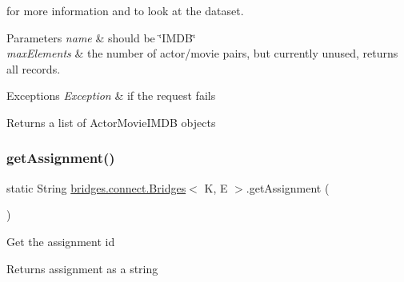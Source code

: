 for more information and to look at the dataset.


\begin{DoxyParams}{Parameters}
{\em name} & should be \char`\"{}\+I\+M\+D\+B\char`\"{} \\
\hline
{\em max\+Elements} & the number of actor/movie pairs, but currently unused, returns all records. \\
\hline
\end{DoxyParams}

\begin{DoxyExceptions}{Exceptions}
{\em Exception} & if the request fails\\
\hline
\end{DoxyExceptions}
\begin{DoxyReturn}{Returns}
a list of Actor\+Movie\+I\+M\+DB objects 
\end{DoxyReturn}
\hypertarget{classbridges_1_1connect_1_1_bridges_ae488b9bf0d696adb7f5a6ba7ce4ff2fd}{}\label{classbridges_1_1connect_1_1_bridges_ae488b9bf0d696adb7f5a6ba7ce4ff2fd} 
\subsubsection{\texorpdfstring{get\+Assignment()}{getAssignment()}}
{\footnotesize\ttfamily static String \hyperlink{classbridges_1_1connect_1_1_bridges}{bridges.\+connect.\+Bridges}$<$ K, E $>$.get\+Assignment (\begin{DoxyParamCaption}{ }\end{DoxyParamCaption})\hspace{0.3cm}{\ttfamily [static]}}

Get the assignment id

\begin{DoxyReturn}{Returns}
assignment as a string 
\end{DoxyReturn}
\hypertarget{classbridges_1_1connect_1_1_bridges_ad8f145f95222730fad3c0628b42f0128}{}\label{classbridges_1_1connect_1_1_bridges_ad8f145f95222730fad3c0628b42f0128} 
